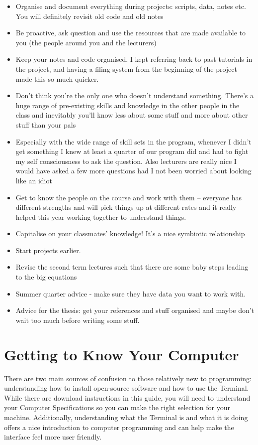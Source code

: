 \documentclass[
]{book}
\providecommand{\tightlist}{%
  \setlength{\itemsep}{0pt}\setlength{\parskip}{0pt}}
\begin{document}
\begin{itemize}
\tightlist
\item
  Organise and document everything during projects: scripts, data, notes etc. You will definitely revisit old code and old notes
\item
  Be proactive, ask question and use the resources that are made available to you (the people around you and the lecturers)
\item
  Keep your notes and code organised, I kept referring back to past tutorials in the project, and having a filing system from the beginning of the project made this so much quicker.
\item
  Don't think you're the only one who doesn't understand something. There's a huge range of pre-existing skills and knowledge in the other people in the class and inevitably you'll know less about some stuff and more about other stuff than your pals
\item
  Especially with the wide range of skill sets in the program, whenever I didn't get something I knew at least a quarter of our program did and had to fight my self consciousness to ask the question. Also lecturers are really nice I would have asked a few more questions had I not been worried about looking like an idiot
\item
  Get to know the people on the course and work with them -- everyone has different strengths and will pick things up at different rates and it really helped this year working together to understand things.
\item
  Capitalise on your classmates' knowledge! It's a nice symbiotic relationship
\item
  Start projects earlier.
\item
  Revise the second term lectures such that there are some baby steps leading to the big equations
\item
  Summer quarter advice - make sure they have data you want to work with.
\item
  Advice for the thesis: get your references and stuff organised and maybe don't wait too much before writing some stuff.
\end{itemize}

\chapter{Getting to Know Your Computer}\label{getting-to-know-your-computer}

There are two main sources of confusion to those relatively new to programming: understanding how to install open-source software and how to use the Terminal. While there are download instructions in this guide, you will need to understand your Computer Specifications so you can make the right selection for your machine. Additionally, understanding what the Terminal is and what it is doing offers a nice introduction to computer programming and can help make the interface feel more user friendly.
\end{document}

